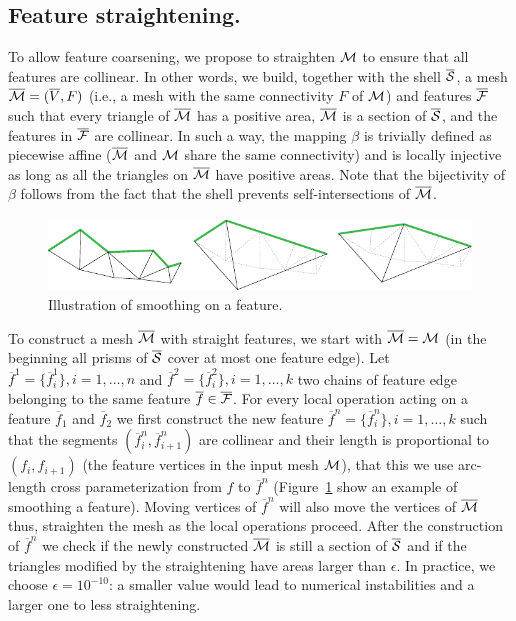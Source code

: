 
\subsection{Feature straightening.}\label{cumin:sec:snapping}
To allow feature coarsening, we propose to straighten $\mathcal{M}$ to ensure that all features are collinear. In other words, we build, together with the shell $\overline{\mathcal{S}}$, a mesh $\overline{\mathcal{M}} = (\overline V,F)$ (i.e., a mesh with the same connectivity $F$ of $\mathcal{M}$) and features $\overline {\operatorname{\mathcal{F}}}$ such that every triangle of $\overline {\mathcal{M}}$ has a positive area, $\overline {\mathcal{M}}$ is a section of $\overline{\mathcal{S}}$, and the features in $\overline{\operatorname{\mathcal{F}}}$ are collinear. 
In such a way, the mapping $\beta$ is trivially defined as piecewise affine ($\overline{\mathcal{M}}$ and $\mathcal{M}$ share the same connectivity) and is locally injective as long as all the triangles on $\overline{\mathcal{M}}$ have positive {areas}. Note that the bijectivity of $\beta$ follows from the fact that the shell prevents self-intersections of $\overline{\mathcal{M}}$.


\begin{figure}
    \centering
    \includegraphics[width=\linewidth]{curve_meshing_in_shell_tex/figs/illustrations/loc-op.pdf}
    \caption{Illustration of smoothing on a feature.}
    \label{bichon:fig:loc-op}
\end{figure}

To construct a mesh $\overline{\mathcal{M}}$ with straight features, 
we start with $\overline{\mathcal{M}} = \mathcal{M}$ (in the beginning all prisms of $\overline{\mathcal{S}}$ cover at most one feature edge).
Let $\overline f^1 = \{\overline f_i^1\}, i=1,\dots,n$ and $\overline f^2 = \{\overline f_i^2\}, i=1,\dots,k$ two chains of {feature} edge belonging to the same feature $\overline f \in \overline{\operatorname{\mathcal{F}}}$.
For every local operation acting on a feature $\overline f_1$ and $\overline f_2$  we first construct the new feature $\overline f^n = \{\overline f_i^n\}, i=1,\dots,k$ such that the segments $(\overline f_i^n, \overline f_{i+1}^n)$ are collinear and their length is proportional to $( f_i, f_{i+1})$ (the feature vertices in the input mesh $\mathcal{M}$), that this we use arc-length cross parameterization from $f$ to $\overline f^n$ (Figure~\ref{bichon:fig:loc-op} show an example of smoothing a feature). Moving vertices of $\overline f^n$ will also move the vertices of $\overline{\mathcal{M}}$ thus, straighten the mesh as the local operations {proceed}. After the construction of $\overline f^n$ we check if the newly constructed $\overline{\mathcal{M}}$ is still a section of $\overline{\mathcal{S}}$ and if the triangles modified by the straightening have {areas} larger than  $\epsilon$. In practice, we choose $\epsilon=10^{-10}$: a smaller value would lead to numerical instabilities and a larger one to less straightening.

